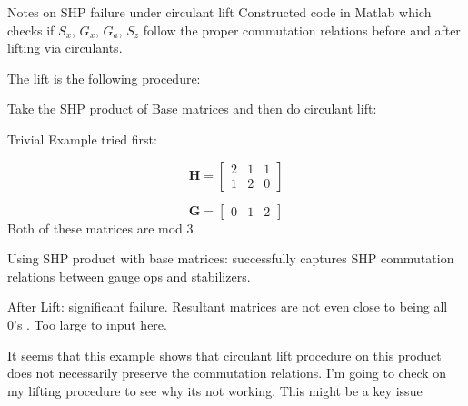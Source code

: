 Notes on SHP failure under circulant lift
Constructed code in Matlab which checks if $S_{x}$, $G_{x}$, $G_{a}$, $S_{z}$ follow the proper commutation relations before and after lifting via circulants.


The lift is the following procedure:

Take the SHP product of Base matrices and then do circulant lift:


Trivial Example tried first:

\begin{equation}
   \boldsymbol{H}= \begin{bmatrix}
    2&1&1\\
    1&2&0
\end{bmatrix}
\end{equation}

\begin{equation}
   \boldsymbol{G}= \begin{bmatrix}
    0&1&2

\end{bmatrix}
\end{equation}
Both of these matrices are mod 3

Using SHP product with base matrices: successfully captures SHP commutation relations between gauge ops and stabilizers. 

After Lift: significant failure.  Resultant matrices are not even close to being all 0's . Too large to input here. 
    

It seems that this example shows that circulant lift procedure on this product does not necessarily preserve the commutation relations. 
I'm going to check on my lifting procedure to see why its not working. This might be a key issue

